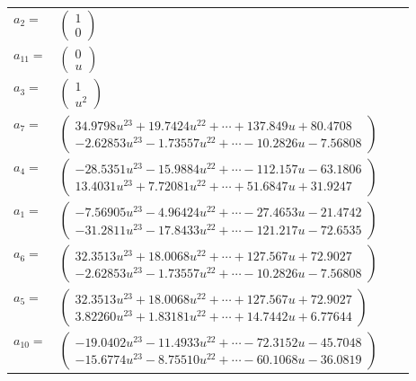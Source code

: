 \documentclass[1p]{elsarticle_modified}
\theoremstyle{definition}
\begin{document}
\begin{tabular}{m{7pt} m{180pt} m{7pt} m{180pt} }
\flushright $a_{2}=$&$\begin{pmatrix}1\\0\end{pmatrix}$ \\
\flushright $a_{11}=$&$\begin{pmatrix}0\\u\end{pmatrix}$ \\
\flushright $a_{3}=$&$\begin{pmatrix}1\\u^2\end{pmatrix}$ \\
\flushright $a_{7}=$&$\begin{pmatrix}34.9798 u^{23}+19.7424 u^{22}+\cdots+137.849 u+80.4708\\-2.62853 u^{23}-1.73557 u^{22}+\cdots-10.2826 u-7.56808\end{pmatrix}$ \\
\flushright $a_{4}=$&$\begin{pmatrix}-28.5351 u^{23}-15.9884 u^{22}+\cdots-112.157 u-63.1806\\13.4031 u^{23}+7.72081 u^{22}+\cdots+51.6847 u+31.9247\end{pmatrix}$ \\
\flushright $a_{1}=$&$\begin{pmatrix}-7.56905 u^{23}-4.96424 u^{22}+\cdots-27.4653 u-21.4742\\-31.2811 u^{23}-17.8433 u^{22}+\cdots-121.217 u-72.6535\end{pmatrix}$ \\
\flushright $a_{6}=$&$\begin{pmatrix}32.3513 u^{23}+18.0068 u^{22}+\cdots+127.567 u+72.9027\\-2.62853 u^{23}-1.73557 u^{22}+\cdots-10.2826 u-7.56808\end{pmatrix}$ \\
\flushright $a_{5}=$&$\begin{pmatrix}32.3513 u^{23}+18.0068 u^{22}+\cdots+127.567 u+72.9027\\3.82260 u^{23}+1.83181 u^{22}+\cdots+14.7442 u+6.77644\end{pmatrix}$ \\
\flushright $a_{10}=$&$\begin{pmatrix}-19.0402 u^{23}-11.4933 u^{22}+\cdots-72.3152 u-45.7048\\-15.6774 u^{23}-8.75510 u^{22}+\cdots-60.1068 u-36.0819\end{pmatrix}$ \\

\end{tabular}
\end{document}
